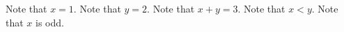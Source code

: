 Note that $x = 1$.
Note that $y = 2$.
Note that $x + y = 3$.
Note that $x < y$.
Note that $x$ is odd.